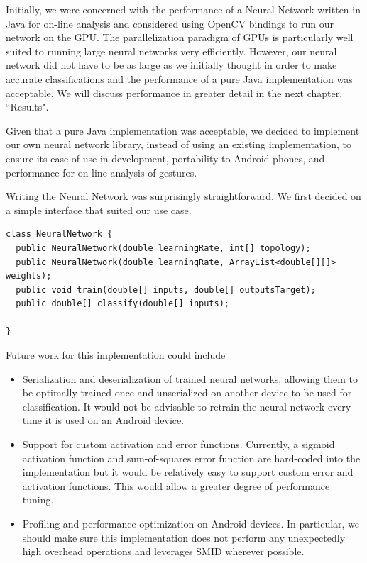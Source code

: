 \documentclass{report}
\begin{document}
Initially, we were concerned with the performance of a Neural Network written in Java for on-line analysis and considered using OpenCV bindings to run our network on the GPU. The parallelization paradigm of GPUs is particularly well suited to running large neural networks very efficiently. However, our neural network did not have to be as large as we initially thought in order to make accurate classifications and the performance of a pure Java implementation was acceptable. We will discuss performance in greater detail in the next chapter, ``Results".

Given that a pure Java implementation was acceptable, we decided to implement our own neural network library, instead of using an existing implementation, to ensure its ease of use in development, portability to Android phones, and performance for on-line analysis of gestures.

Writing the Neural Network was surprisingly straightforward. We first decided on a simple interface that suited our use case.
\begin{verbatim}
class NeuralNetwork {
  public NeuralNetwork(double learningRate, int[] topology);
  public NeuralNetwork(double learningRate, ArrayList<double[][]> weights);
  public void train(double[] inputs, double[] outputsTarget);
  public double[] classify(double[] inputs);

}
\end{verbatim}

Future work for this implementation could include
\begin{itemize}
\item Serialization and deserialization of trained neural networks, allowing them to be optimally trained once and unserialized on another device to be used for classification. It would not be advisable to retrain the neural network every time it is used on an Android device.
\item Support for custom activation and error functions. Currently, a sigmoid activation function and sum-of-squares error function are hard-coded into the implementation but it would be relatively easy to support custom error and activation functions. This would allow a greater degree of performance tuning.
\item Profiling and performance optimization on Android devices. In particular, we should make sure this implementation does not perform any unexpectedly high overhead operations and leverages SMID wherever possible.
\end{itemize}
\end{document}
